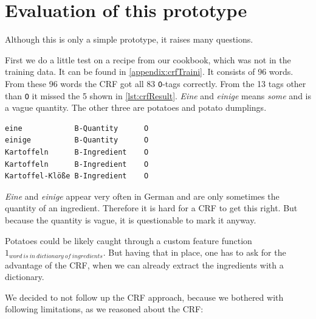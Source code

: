 \documentclass[12pt, twoside]{report}
\begin{document}
\section{Evaluation of this prototype}
Although this is only a simple prototype, it raises many questions.

First we do a little test on a recipe from our cookbook, which was not in the training data. It can be found in \cref{appendix:crfTraini}. It consists of 96 words. From these 96 words the CRF got all 83 \texttt{O}-tags correctly. From the 13 tags other than \texttt{O} it missed the 5 shown in \cref{lst:crfResult}. \textit{Eine} and \textit{einige} means \textit{some} and is a vague quantity. The other three are potatoes and potato dumplings.

\begin{lstlisting}[caption={Differences}, label=lst:crfResult]
eine            B-Quantity      O
einige          B-Quantity      O
Kartoffeln      B-Ingredient    O
Kartoffeln      B-Ingredient    O 
Kartoffel-Klöße B-Ingredient    O
\end{lstlisting}

\textit{Eine} and \textit{einige} appear very often in German and are only sometimes the quantity of an ingredient. Therefore it is hard for a CRF to get this right. But because the quantity is vague, it is questionable to mark it anyway.

Potatoes could be likely caught through a custom feature function $1_ {word\ is\ in\ dictionary\ of\ ingredients}$. But having that in place, one has to ask for the advantage of the CRF, when we can already extract the ingredients with a dictionary.

We decided to not follow up the CRF approach, because we bothered with following limitations, as we reasoned about the CRF:
\end{document}
